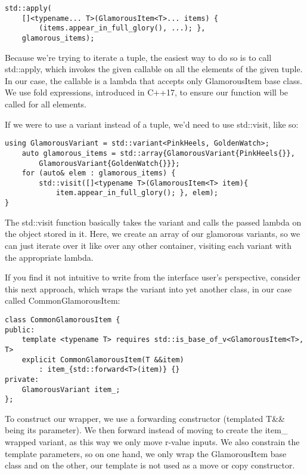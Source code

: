 \begin{lstlisting}[style=styleCXX]
std::apply(
	[]<typename... T>(GlamorousItem<T>... items) {
		(items.appear_in_full_glory(), ...); },
	glamorous_items);
\end{lstlisting}

Because we're trying to iterate a tuple, the easiest way to do so is to call std::apply, which invokes the given callable on all the elements of the given tuple. In our case, the callable is a lambda that accepts only GlamorousItem base class. We use fold expressions, introduced in C++17, to ensure our function will be called for all elements.

If we were to use a variant instead of a tuple, we'd need to use std::visit, like so:

\begin{lstlisting}[style=styleCXX]
	using GlamorousVariant = std::variant<PinkHeels, GoldenWatch>;
	auto glamorous_items = std::array{GlamorousVariant{PinkHeels{}},
		GlamorousVariant{GoldenWatch{}}};
	for (auto& elem : glamorous_items) {
		std::visit([]<typename T>(GlamorousItem<T> item){
			item.appear_in_full_glory(); }, elem);
}
\end{lstlisting}

The std::visit function basically takes the variant and calls the passed lambda on the object stored in it. Here, we create an array of our glamorous variants, so we can just iterate over it like over any other container, visiting each variant with the appropriate lambda.

If you find it not intuitive to write from the interface user's perspective, consider this next approach, which wraps the variant into yet another class, in our case called CommonGlamorousItem:

\begin{lstlisting}[style=styleCXX]
class CommonGlamorousItem {
public:
	template <typename T> requires std::is_base_of_v<GlamorousItem<T>, T>
	explicit CommonGlamorousItem(T &&item)
		: item_{std::forward<T>(item)} {}
private:
	GlamorousVariant item_;
};
\end{lstlisting}

To construct our wrapper, we use a forwarding constructor (templated T\&\& being its parameter). We then forward instead of moving to create the item\_ wrapped variant, as this way we only move r-value inputs. We also constrain the template parameters, so on one hand, we only wrap the GlamorousItem base class and on the other, our template is not used as a move or copy constructor.

